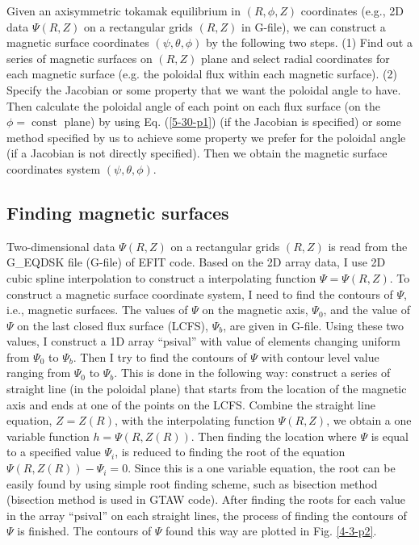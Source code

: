 \documentclass{llncs}
\newcommand{\tmop}[1]{\ensuremath{\operatorname{#1}}}
\begin{document}
Given an axisymmetric tokamak equilibrium in $(R, \phi, Z)$ coordinates (e.g.,
2D data $\Psi (R, Z)$ on a rectangular grids $(R, Z)$ in G-file), we can
construct a magnetic surface coordinates $(\psi, \theta, \phi)$ by the
following two steps. (1) Find out a series of magnetic surfaces on $(R, Z)$
plane and select radial coordinates for each magnetic surface (e.g. the
poloidal flux within each magnetic surface). (2) Specify the Jacobian or some
property that we want the poloidal angle to have. Then calculate the poloidal
angle of each point on each flux surface (on the $\phi = \tmop{const}$ plane)
by using Eq. (\ref{5-30-p1}) (if the Jacobian is specified) or some method
specified by us to achieve some property we prefer for the poloidal angle (if
a Jacobian is not directly specified). Then we obtain the magnetic surface
coordinates system $(\psi, \theta, \phi)$.

\subsection{Finding magnetic surfaces}

Two-dimensional data $\Psi (R, Z)$ on a rectangular grids $(R, Z)$ is read
from the G\_EQDSK file (G-file) of EFIT code. Based on the 2D array data, I
use 2D cubic spline interpolation to construct a interpolating function $\Psi
= \Psi (R, Z)$. To construct a magnetic surface coordinate system, I need to
find the contours of $\Psi$, i.e., magnetic surfaces. The values of $\Psi$ on
the magnetic axis, $\Psi_0$, and the value of $\Psi$ on the last closed flux
surface (LCFS), $\Psi_b$, are given in G-file. Using these two values, I
construct a 1D array ``psival'' with value of elements changing uniform from
$\Psi_0$ to $\Psi_b$. Then I try to find the contours of $\Psi$ with contour
level value ranging from $\Psi_0$ to $\Psi_b$. This is done in the following
way: construct a series of straight line (in the poloidal plane) that starts
from the location of the magnetic axis and ends at one of the points on the
LCFS. Combine the straight line equation, $Z = Z (R)$, with the interpolating
function $\Psi (R, Z)$, we obtain a one variable function $h = \Psi (R, Z
(R))$. Then finding the location where $\Psi$ is equal to a specified value
$\Psi_i$, is reduced to finding the root of the equation $\Psi (R, Z (R)) -
\Psi_i = 0$. Since this is a one variable equation, the root can be easily
found by using simple root finding scheme, such as bisection method (bisection
method is used in GTAW code). After finding the roots for each value in the
array ``psival'' on each straight lines, the process of finding the contours
of $\Psi$ is finished. The contours of $\Psi$ found this way are plotted in
Fig. \ref{4-3-p2}.
\end{document}
